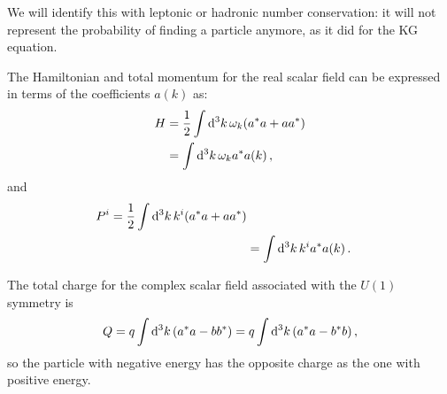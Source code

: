 \documentclass[main.tex]{subfiles}
\begin{document}
We will identify this with leptonic or hadronic number conservation: it will not represent the probability of finding a particle anymore, as it did for the KG equation. 

\begin{claim}
The Hamiltonian and total momentum for the real scalar field can be expressed in terms of the coefficients \(a(k)\) as: 
%
\begin{align}
H &=  \frac{1}{2} \int \dd[3]{k} \omega_{k}  \qty(a^{*}a + a a^{*})\\
&= \int \dd[3]{k} \omega_{k} a^{*} a(k)
\,,
\end{align}
%
and 
%
\begin{align}
P^{i} = \frac{1}{2} \int \dd[3]{k} k^{i}  \qty(a^{*}a + a a^{*})\\
&= \int \dd[3]{k} k^{i} a^{*} a(k) 
\,.
\end{align}
\end{claim}

\begin{claim}
The total charge for the complex scalar field associated with the \(U(1)\) symmetry is 
%
\begin{align}
Q = q\int \dd[3]{k} \qty(a^{*}a - bb^{*})
= q\int \dd[3]{k} \qty(a^{*}a - b^{*}b)
\,,
\end{align}
%
so the particle with negative energy has the opposite charge as the one with positive energy.
\end{claim}
\end{document}
